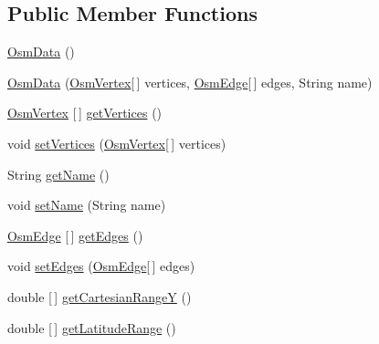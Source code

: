 \subsection*{Public Member Functions}
\begin{DoxyCompactItemize}
\item 
\hyperlink{classbridges_1_1data__src__dependent_1_1_osm_data_a1ba678dfedee33772a620d678f7a04d8}{Osm\+Data} ()
\item 
\hyperlink{classbridges_1_1data__src__dependent_1_1_osm_data_a822667d3269b059bf14e80c36b12fbb9}{Osm\+Data} (\hyperlink{classbridges_1_1data__src__dependent_1_1_osm_vertex}{Osm\+Vertex}\mbox{[}$\,$\mbox{]} vertices, \hyperlink{classbridges_1_1data__src__dependent_1_1_osm_edge}{Osm\+Edge}\mbox{[}$\,$\mbox{]} edges, String name)
\item 
\hyperlink{classbridges_1_1data__src__dependent_1_1_osm_vertex}{Osm\+Vertex} \mbox{[}$\,$\mbox{]} \hyperlink{classbridges_1_1data__src__dependent_1_1_osm_data_a4dc0a205132f1143e628398e08057362}{get\+Vertices} ()
\item 
void \hyperlink{classbridges_1_1data__src__dependent_1_1_osm_data_ad31b467d79dd0b76f75f93b5e192e1e3}{set\+Vertices} (\hyperlink{classbridges_1_1data__src__dependent_1_1_osm_vertex}{Osm\+Vertex}\mbox{[}$\,$\mbox{]} vertices)
\item 
String \hyperlink{classbridges_1_1data__src__dependent_1_1_osm_data_ab239e638adb7cd65a3fc7e735f6d1e61}{get\+Name} ()
\item 
void \hyperlink{classbridges_1_1data__src__dependent_1_1_osm_data_abdc3131be4ca17fcf53a5728a7932bda}{set\+Name} (String name)
\item 
\hyperlink{classbridges_1_1data__src__dependent_1_1_osm_edge}{Osm\+Edge} \mbox{[}$\,$\mbox{]} \hyperlink{classbridges_1_1data__src__dependent_1_1_osm_data_a1ceb1a4b7acd75ca655ad0769f6b427d}{get\+Edges} ()
\item 
void \hyperlink{classbridges_1_1data__src__dependent_1_1_osm_data_a88cf686718bcd27a82e2c8fb74b649f2}{set\+Edges} (\hyperlink{classbridges_1_1data__src__dependent_1_1_osm_edge}{Osm\+Edge}\mbox{[}$\,$\mbox{]} edges)
\item 
double \mbox{[}$\,$\mbox{]} \hyperlink{classbridges_1_1data__src__dependent_1_1_osm_data_a66e066ca35c27f82190e94e6c530d635}{get\+Cartesian\+RangeY} ()
\item 
double \mbox{[}$\,$\mbox{]} \hyperlink{classbridges_1_1data__src__dependent_1_1_osm_data_a406042fe56541f04c059a1f1ec887c81}{get\+Latitude\+Range} ()
\item 

\end{DoxyCompactItemize}
